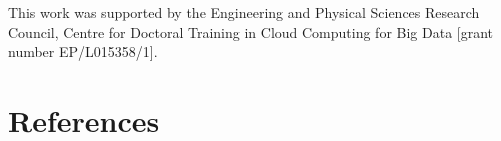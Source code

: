 \documentclass[final,3p,times,twocolumn,numbers]{elsarticle}
\begin{document}
This work was supported by the Engineering and Physical Sciences Research Council, Centre for Doctoral Training in Cloud Computing for Big Data [grant number EP/L015358/1].







   
  \section*{References}
  


%
%
%
\end{document}
